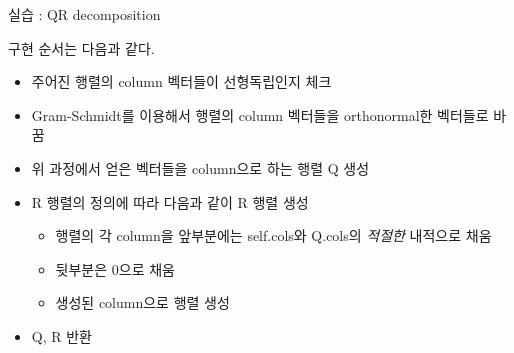 \documentclass{beamer}
\begin{document}
\begin{frame}{실습 : QR decomposition}

구현 순서는 다음과 같다. 
\begin{itemize} 
\item 주어진 행렬의 column 벡터들이 선형독립인지 체크 
\item Gram-Schmidt를 이용해서 행렬의 column 벡터들을 orthonormal한 벡터들로 바꿈 
\item 위 과정에서 얻은 벡터들을 column으로 하는 행렬 Q 생성
\item R 행렬의 정의에 따라 다음과 같이 R 행렬 생성 
\begin{itemize} 
\item 행렬의 각 column을 앞부분에는 self.cols와 Q.cols의 \textit{적절한} 내적으로 채움 
\item 뒷부분은 0으로 채움 
\item 생성된 column으로 행렬 생성 
\end{itemize}
\item Q, R 반환
\end{itemize}
\end{frame}











\end{document}
